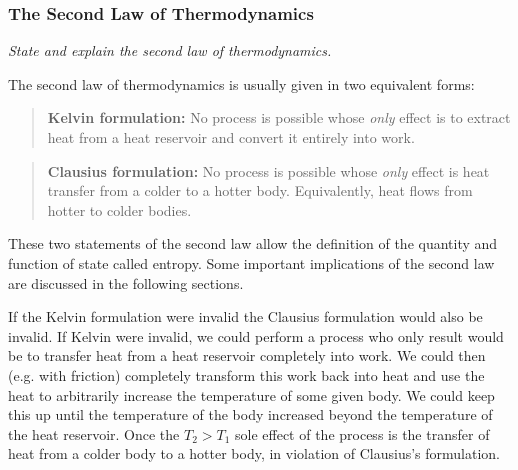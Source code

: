\documentclass[11pt, a4paper]{article}
\begin{document}
\subsubsection{The Second Law of Thermodynamics}
\textit{State and explain the second law of thermodynamics.}

\smallskip
The second law of thermodynamics is usually given in two equivalent forms:
\begin{quote}
	\textbf{Kelvin formulation:} No process is possible whose \textit{only} effect is to extract heat from a heat reservoir and convert it entirely into work.
\end{quote}
\begin{quote}
	\textbf{Clausius formulation:} No process is possible whose \textit{only} effect is heat transfer from a colder to a hotter body. Equivalently, heat flows from hotter to colder bodies.
\end{quote}
These two statements of the second law allow the definition of the quantity and function of state called entropy. Some important implications of the second law are discussed in the following sections.

\smallskip 
If the Kelvin formulation were invalid the Clausius formulation would also be invalid. If Kelvin were invalid, we could perform a process who only result would be to transfer heat from a heat reservoir completely into work. We could then (e.g. with friction) completely transform this work back into heat and use the heat to arbitrarily increase the temperature of some given body. We could keep this up until the temperature of the body increased beyond the temperature of the heat reservoir. Once the $ T_{2} > T_{1} $ sole effect of the process is the transfer of heat from a colder body to a hotter body, in violation of Clausius's formulation. 
\end{document}
